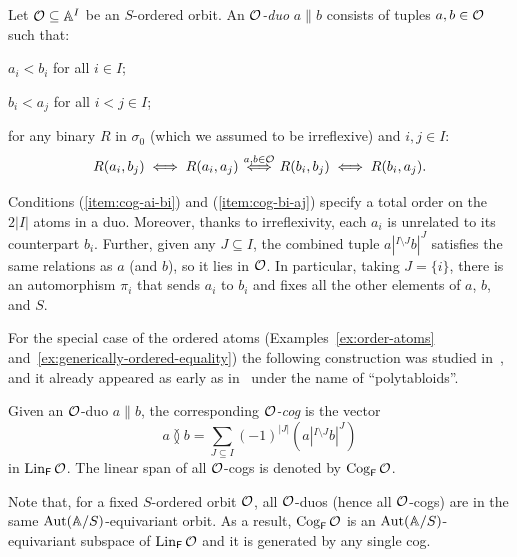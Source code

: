 \begin{definition}\label{def:duo}
    Let $\cal O \subseteq \A^I$ be an $S$-ordered orbit. 
    An \emph{$\cal O$-duo} $a \parallel b$ consists of tuples $a, b \in \cal O$ such that:
    \begin{bracketenumerate}
        \item\label{item:cog-ai-bi} 
        $a_i < b_i$ for all $i\in I$;
        
        \item\label{item:cog-bi-aj}  
        $b_i < a_j$ for all $i<j\in I$;

        \item 
        for any binary $R$ in $\sigma_0$ (which we assumed to be irreflexive) and $i,j\in I$:
        \[
            R(a_i,b_j) \iff R(a_i,a_j) \stackrel{a,b\in\cal O}{\iff} R(b_i,b_j) \iff R(b_i,a_j).           
        \]
     \end{bracketenumerate}
\end{definition}
\begin{remark}\label{rem:duo}
Conditions (\ref{item:cog-ai-bi}) and (\ref{item:cog-bi-aj}) specify a total order on the $2|I|$ atoms in a duo.
Moreover, thanks to irreflexivity, 
each $a_i$ is unrelated to its counterpart $b_i$.
Further, given any $J \subseteq I$, the combined tuple $a|^{I\setminus J} b|^J$ satisfies the same relations as $a$ (and $b$), so it lies in $\cal O$. 
In particular, taking $J=\{i\}$, there is an automorphism $\pi_i$ that sends $a_i$ to $b_i$ and fixes all the other elements of $a$, $b$, and $S$.
\lipicsEnd\end{remark}

For the special case of the ordered atoms (Examples~\ref{ex:order-atoms} and~\ref{ex:generically-ordered-equality}) the following construction was studied in~\cite[p.~11]{BFKM24}, and it already appeared as early as in~\cite[p.~125]{Gray97} under the name of ``polytabloids''.

\begin{definition}
    Given an $\cal O$-duo $a \parallel b$, the corresponding \emph{$\cal O$-cog} is the vector
    \[
        a \between b =
        \sum_{J \subseteq I} (-1)^{|J|}
        (a|^{I \setminus J} b|^{J})
    \]
    in $\Lin_\FF \cal O$. %
    The linear span of all $\cal O$-cogs is denoted by $\Cog_\FF \cal O$.
\end{definition}
Note that, for a fixed $S$-ordered orbit $\cal O$, all $\cal O$-duos (hence all $\cal O$-cogs) are in the same $\Aut(\A/S)$-equivariant orbit.
As a result, $\Cog_\FF \cal O$ is an $\Aut(\A/S)$-equivariant subspace of $\Lin_\FF \cal O$ and it is generated by any single cog.

